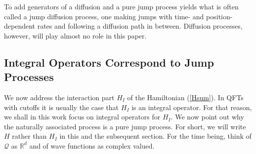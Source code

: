 \documentclass[12pt]{article}
\newcommand{\RRR}{\mathbb{R}} %
\newcommand{\1}{\mathbf{1}} %
\newcommand{\conf}{\mathcal{Q}} %
\newcommand{\inter}{{I}} %
\begin{document}
To add generators of a diffusion and a pure jump process yields what
is often called a jump diffusion process, one making jumps with time-
and position-dependent rates and following a diffusion path in between.
Diffusion processes, however, will play almost no role in this paper.


\subsection{Integral Operators Correspond to Jump Processes}
\label{sec:mini1}

We now address the interaction part $H_\inter$ of the Hamiltonian
(\ref{Hsum}).  In QFTs with cutoffs it is usually the case that
$H_\inter$ is an integral operator.  For that reason, we shall in this
work focus on integral operators for $H_\inter$.  We now point out why
the naturally associated process is a pure jump process.  For short,
we will write $H$ rather than $H_\inter$ in this and the subsequent
section. For the time being, think of $\conf$ as $\RRR^d$ and of wave
functions as complex valued.
\end{document}
